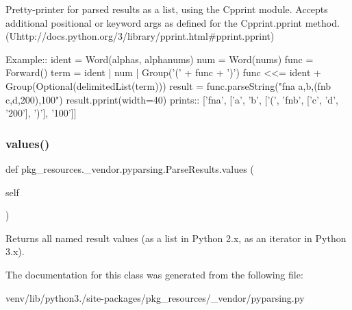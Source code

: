 \begin{DoxyVerb}Pretty-printer for parsed results as a list, using the C{pprint} module.
Accepts additional positional or keyword args as defined for the 
C{pprint.pprint} method. (U{http://docs.python.org/3/library/pprint.html#pprint.pprint})

Example::
    ident = Word(alphas, alphanums)
    num = Word(nums)
    func = Forward()
    term = ident | num | Group('(' + func + ')')
    func <<= ident + Group(Optional(delimitedList(term)))
    result = func.parseString("fna a,b,(fnb c,d,200),100")
    result.pprint(width=40)
prints::
    ['fna',
     ['a',
      'b',
      ['(', 'fnb', ['c', 'd', '200'], ')'],
      '100']]
\end{DoxyVerb}
 \mbox{\label{classpkg__resources_1_1__vendor_1_1pyparsing_1_1_parse_results_afb27b1e16010219f2a19c5605f5f1163}} 
\subsubsection{\texorpdfstring{values()}{values()}}
{\footnotesize\ttfamily def pkg\+\_\+resources.\+\_\+vendor.\+pyparsing.\+Parse\+Results.\+values (\begin{DoxyParamCaption}\item[{}]{self }\end{DoxyParamCaption})}

\begin{DoxyVerb}Returns all named result values (as a list in Python 2.x, as an iterator in Python 3.x).\end{DoxyVerb}
 

The documentation for this class was generated from the following file\+:\begin{DoxyCompactItemize}
\item 
venv/lib/python3./site-\/packages/pkg\+\_\+resources/\+\_\+vendor/pyparsing.\+py\end{DoxyCompactItemize}
